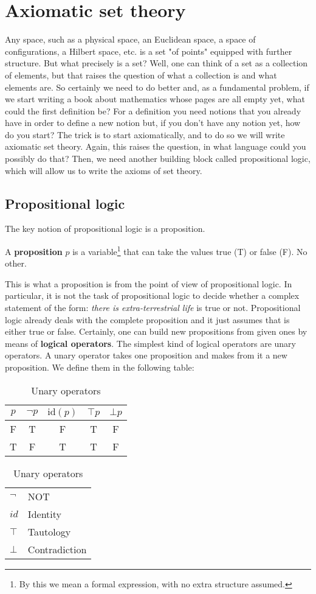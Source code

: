 \documentclass[root.tex]{subfiles}
\begin{document}
\chapter{Axiomatic set theory}

Any space, such as a physical space, an Euclidean space, a space of configurations, a Hilbert space, etc. is a set "of points" equipped with further structure. But what precisely is a set? Well, one can think of a set as a collection of elements, but that raises the question of what a collection is and what elements are. So certainly we need to do better and, as a fundamental problem, if we start writing a book about mathematics whose pages are all empty yet, what could the first definition be? For a definition you need notions that you already have in order to define a new notion but, if you don't have any notion yet, how do you start? The trick is to start axiomatically, and to do so we will write axiomatic set theory. Again, this raises the question, in what language could you possibly do that? Then, we need another building block called propositional logic, which will allow us to write the axioms of set theory. 

\section{Propositional logic}
The key notion of propositional logic is a proposition. 
\begin{mydef}
  A \textbf{proposition} $p$ is a variable\footnote{By this we mean a formal expression, with no extra structure assumed.} that can take the values true (T) or false (F). No other. 
\end{mydef}
This is what a proposition is from the point of view of propositional logic. In particular, it is not the task of propositional logic to decide whether a complex statement of the form: \emph{there is extra-terrestrial life} is true or not. Propositional logic already deals with the complete proposition and it just assumes that is either true or false. Certainly, one can build new propositions from given ones by means of \textbf{logical operators}. The simplest kind of logical operators are unary operators. A unary operator takes one proposition and makes from it a new proposition. We define them in the following table:
    \begin{table}[h]
      \centering
      \begin{tabular}{c||c|c|c|c}
        $p$ & $\neg p$ & $\mathrm{id}(p)$ & $\top p$ & $\bot p$ \\
        \hline
        \rule{0pt}{12pt} F & T & F & T & F\\
                         T & F & T & T & F
      \end{tabular}\qquad
      \begin{tabular}{ll}
        $\neg$ & NOT\\
        $id$   & Identity\\
        $\top$ & Tautology\\
        $\bot$ & Contradiction
      \end{tabular}
      \caption{Unary operators}
    \end{table}
\end{document}
